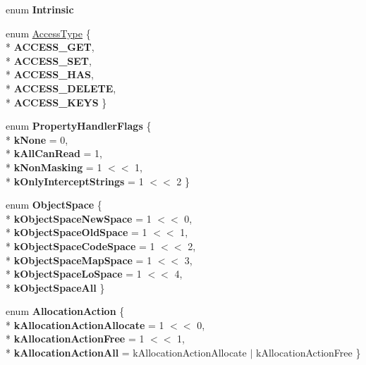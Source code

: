 \begin{DoxyCompactItemize}
\item 
enum {\bfseries Intrinsic} \hypertarget{namespacev8_a67f8ea6a2abeace49b9658da6a3267ab}{}\label{namespacev8_a67f8ea6a2abeace49b9658da6a3267ab}

\item 
enum \hyperlink{namespacev8_add8bef6469c5b94706584124e610046c}{Access\+Type} \{ \\*
{\bfseries A\+C\+C\+E\+S\+S\+\_\+\+G\+ET}, 
\\*
{\bfseries A\+C\+C\+E\+S\+S\+\_\+\+S\+ET}, 
\\*
{\bfseries A\+C\+C\+E\+S\+S\+\_\+\+H\+AS}, 
\\*
{\bfseries A\+C\+C\+E\+S\+S\+\_\+\+D\+E\+L\+E\+TE}, 
\\*
{\bfseries A\+C\+C\+E\+S\+S\+\_\+\+K\+E\+YS}
 \}
\item 
enum {\bfseries Property\+Handler\+Flags} \{ \\*
{\bfseries k\+None} = 0, 
\\*
{\bfseries k\+All\+Can\+Read} = 1, 
\\*
{\bfseries k\+Non\+Masking} = 1 $<$$<$ 1, 
\\*
{\bfseries k\+Only\+Intercept\+Strings} = 1 $<$$<$ 2
 \}\hypertarget{namespacev8_af4789f0aeb8680e353901a35810cac1a}{}\label{namespacev8_af4789f0aeb8680e353901a35810cac1a}

\item 
enum {\bfseries Object\+Space} \{ \\*
{\bfseries k\+Object\+Space\+New\+Space} = 1 $<$$<$ 0, 
\\*
{\bfseries k\+Object\+Space\+Old\+Space} = 1 $<$$<$ 1, 
\\*
{\bfseries k\+Object\+Space\+Code\+Space} = 1 $<$$<$ 2, 
\\*
{\bfseries k\+Object\+Space\+Map\+Space} = 1 $<$$<$ 3, 
\\*
{\bfseries k\+Object\+Space\+Lo\+Space} = 1 $<$$<$ 4, 
\\*
{\bfseries k\+Object\+Space\+All}
 \}\hypertarget{namespacev8_ae7bc5b0bd1100e94d78de255daa8ebc3}{}\label{namespacev8_ae7bc5b0bd1100e94d78de255daa8ebc3}

\item 
enum {\bfseries Allocation\+Action} \{ \\*
{\bfseries k\+Allocation\+Action\+Allocate} = 1 $<$$<$ 0, 
\\*
{\bfseries k\+Allocation\+Action\+Free} = 1 $<$$<$ 1, 
\\*
{\bfseries k\+Allocation\+Action\+All} = k\+Allocation\+Action\+Allocate $\vert$ k\+Allocation\+Action\+Free
 \}\hypertarget{namespacev8_ae2b70dd2abba164d9ad9ffc9f757eca9}{}\label{namespacev8_ae2b70dd2abba164d9ad9ffc9f757eca9}


\end{DoxyCompactItemize}
